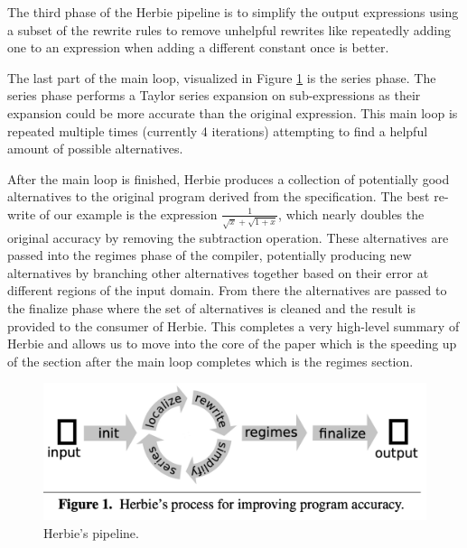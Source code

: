 \documentclass{article}
\begin{document}
The third phase of the Herbie pipeline is to simplify the output expressions using a subset of the rewrite rules to remove unhelpful rewrites like repeatedly adding one to an expression when adding a different constant once is better.

The last part of the main loop, visualized in Figure \ref{fig:herbie-pipeline} is the series phase. The series phase performs a Taylor series expansion on sub-expressions as their expansion could be more accurate than the original expression. This main loop is repeated multiple times (currently 4 iterations) attempting to find a helpful amount of possible alternatives. 

After the main loop is finished, Herbie produces a collection of potentially good alternatives to the original program derived from the specification. The best re-write of our example is the expression $\frac{1}{\sqrt{x} + \sqrt{1 + x}}$, which nearly doubles the original accuracy by removing the subtraction operation. These alternatives are passed into the regimes phase of the compiler, potentially producing new alternatives by branching other alternatives together based on their error at different regions of the input domain. From there the alternatives are passed to the finalize phase where the set of alternatives is cleaned and the result is provided to the consumer of Herbie. This completes a very high-level summary of Herbie and allows us to move into the core of the paper which is the speeding up of the section after the main loop completes which is the regimes section.

\begin{figure}[htbp]
\begin{center}
\includegraphics[scale=0.5]{herbie-pipeline.png}
\caption{Herbie's pipeline.}
\label{fig:herbie-pipeline}
\end{center}
\end{figure}
\end{document}
